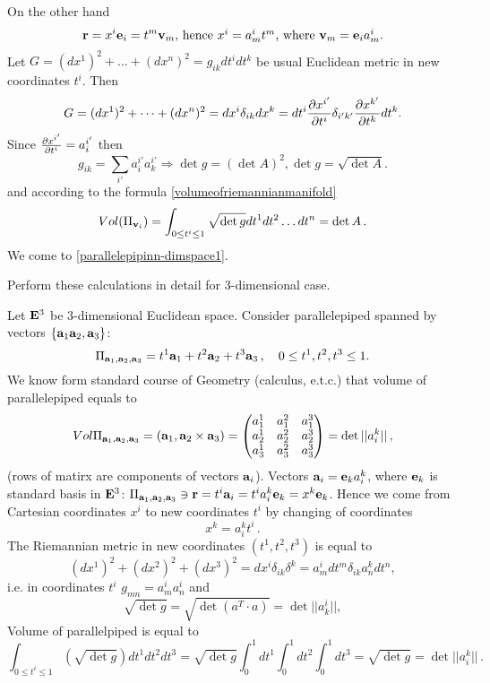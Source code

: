 \documentclass[12pt]{article}
\theoremstyle{theorem}
\numberwithin{equation}{section}
\begin{document}
{On the other hand
             $$
{\bf r}=x^i{\bf e}_i=t^m{\bf v}_m, \,
\hbox{hence $x^i=a^i_m t^m$, where ${\bf v}_m={\bf e}_ia^i_m$.}
             $$
Let $G=(dx^1)^2+\dots+(dx^n)^2=g_{ik}dt^idt^k$ be usual
Euclidean metric in new coordinates $t^i$. Then
          $$
     G=(dx^1)^2+\dots+(dx^n)^2=dx^i\delta_{ik}dx^k=
     dt^{i}{\partial x^{i'}\over \partial t^{i}}\delta_{i'k'}{\partial x^{k'}\over \partial t^{k}}dt^{k}.
          $$
Since   ${\partial x^{i'}\over \partial t^{i}}=a^{i'}_i$ then
                          $$
g_{ik}=\sum_{i'}a^{i'}_i a^{i'}_k\Rightarrow \det g=(\det A)^2, \det g=\sqrt {\det A}.
  $$
and according to the formula \eqref{volumeofriemannianmanifold}
          $$
      Vol(\Pi_{{\bf v}_i})=\int_{0\leq t^i\leq 1} \sqrt{\det g} dt^1dt^2\dots dt^n=\det A\,.
          $$
We come to \eqref{parallelepipinn-dimspace1}.
\m

Perform these calculations in detail for $3$-dimensional case.

\m


Let ${\bf E}^3$ be $3$-dimensional Euclidean space.
Consider  parallelepiped spanned by vectors
$\{{\bf a}_1{\bf a}_2,{\bf a}_3\}$:
                 $$
                 \Pi_{{\bf a}_1,{\bf a}_2,{\bf a}_3}=t^1{\bf a}_1+t^2{\bf a}_2+t^3{\bf a}_3\,,
                    \quad 0\leq t^1,t^2,t^3\leq 1.
                 $$
We know form standard course of Geometry (calculus, e.t.c.) that
volume of parallelepiped equals to
\begin{equation}\label{volparallelepindim3}
Vol \Pi_{{\bf a}_1,{\bf a}_2,{\bf a}_3}=\left({\bf a}_1,{\bf a}_2\times {\bf a}_3\right)=
\begin{pmatrix}
a_1^1&a_1^2 &a_1^3\cr
a_2^1&a_2^2&a_2^3\cr
a_3^1&a_3^2&a_3^3\cr
\end{pmatrix}=\det {||a_i^k||}\,,
\end{equation}
(rows of matirx are components of vectors ${\bf a}_i$).
 Vectors ${\bf a}_i={\bf e}_k a^k_{i}$, where ${\bf e}_k$ is standard basis in ${\bf E}^3$:
 $\Pi_{{\bf a}_1,{\bf a}_2,{\bf a}_3} \ni{\bf r}=t^i{\bf a}_i=t^i a^k_i{\bf e}_k=x^k{\bf e}_k$.
Hence we come from  Cartesian coordinates $x^i$
to new coordinates $t^i$ by changing of coordinates
         $$
         x^k=a^k_it^i\,.
       $$
 The Riemannian metric in new coordinates $(t^1,t^2,t^3)$ is equal to
               $$
   (dx^1)^2+(dx^2)^2+(dx^3)^2=
     dx^i\delta_{ik}\delta^k=a^i_mdt^m\delta_{ik}a^k_n dt^n,
    $$
i.e. in coordinates $t^i$ $g_{mn}=a^i_ma^i_n$ and
            $$
 \sqrt {\det g}=\sqrt {\det(a^T \cdot a)}=\det ||a^i_k||,
     $$
Volume of parallelpiped is equal to
       $$
   \int_{0\leq t^i\leq 1} \left(\sqrt{\det g}\right)dt^1 dt^2 dt^3=
    \sqrt{\det g}\int_0^1dt^1 \int_0^1 dt^2 \int_0^1 dt^3=
     \sqrt{\det g}=\det ||a^k_i||\,.
      $$



}
\end{document}
